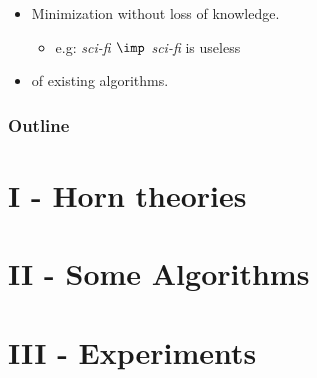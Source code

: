 \documentclass{beamer}
\begin{document}
{{\begin{frame}
\begin{itemize}
	\item Minimization without loss of knowledge.
	\begin{itemize}
		\item[] {\color{midnight} e.g: \textit{sci-fi $\imp$ sci-fi} is useless}
	\end{itemize}
	
	\vspace{1.2em}
	
	\item {} of existing algorithms.
\end{itemize}

\end{frame}



\begin{frame}
\frametitle{Outline}
\tableofcontents

\end{frame}
}}



\section{I - Horn theories}


\section{II - Some Algorithms}


\section{III - Experiments}

\end{document}
